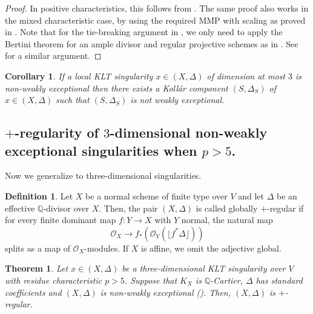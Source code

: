\documentclass[11pt,reqno]{amsart}
\newcommand{\Q}{\mathbb{Q}}
\newcommand{\cO}{\mathcal{O}}
\numberwithin{equation}{section}
\newtheorem{thm}[prop] {Theorem}
\newtheorem{cor}[prop]{Corollary}
\theoremstyle{definition}
\newtheorem{defi}[prop] {Definition}
\begin{document}
\begin{proof}
   In positive characteristics, this follows from \cite[Proposition 2.15]{GongyoNakamuraTanakaRationalPoints} \cite[Theorem 9.37]{BMPSTWWMixedCharMMP}. The same proof also works in the mixed characteristic case, by using the required MMP with scaling as proved in \cite[Theorem~9.37]{BMPSTWWMixedCharMMP}. Note that for the tie-breaking argument in \cite[Proposition 2.15]{GongyoNakamuraTanakaRationalPoints}, we only need to apply the Bertini theorem for an ample divisor and regular projective schemes as in \cite[Theorem 2.17]{BMPSTWWMixedCharMMP}. See \cite[Proof of Theorem 9.27]{BMPSTWWMixedCharMMP} for a similar argument.
\end{proof}

\begin{cor} \label{cor:weaklyexceptionalKollarcomponent}
    If a local KLT singularity $x \in (X, \Delta)$ of dimension at most $3$ is non-weakly exceptional then there exists a Koll\'ar component $(S, \Delta_S)$ of $x \in (X, \Delta)$ such that $(S, \Delta_S)$ is not weakly exceptional.
\end{cor}


\subsection{$+$-regularity of $3$-dimensional non-weakly exceptional singularities when $p >5$.}

Now we generalize  to three-dimensional singularities.

\begin{defi} \label{defiplusreg}
    Let $X$ be a normal scheme of finite type over $V$ and let $\Delta$ be an effective $\Q$-divisor over $X$. Then, the pair $(X, \Delta)$ is called globally $+$-regular if for every finite dominant map $f: Y \to X$ with $Y$ normal, the natural map
    \[ \cO_X \to  f_* (\cO_Y ( \lfloor f^* \Delta \rfloor))  \]
    splits as a map of $\cO_X$-modules. If $X$ is affine, we omit the adjective global.
\end{defi}


\begin{thm} \label{+regforthreedimsingularities}
    Let $x \in (X, \Delta)$ be a three-dimensional KLT singularity over $V$ with residue characteristic $p>5$. Suppose that $K_X$ is $\Q$-Cartier, $\Delta$ has standard coefficients and $(X, \Delta)$ is non-weakly exceptional (). Then, $(X, \Delta)$ is $+$-regular.
\end{thm}
\end{document}

